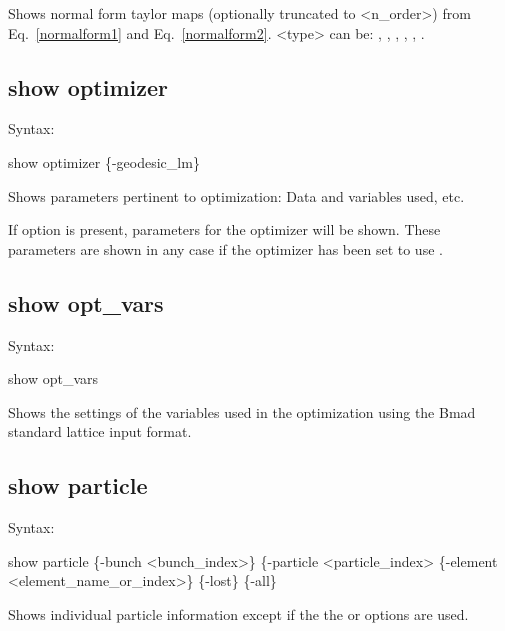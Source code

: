 {{{{{{{{Shows normal form taylor maps (optionally truncated to <n\_order>) from Eq.~\ref{normalform1}
 and Eq.~\ref{normalform2}. <type> can be: , , , , , .


\subsection{show optimizer}
\label{s:show.optimizer}

Syntax:
\begin{example}
  show optimizer \{-geodesic_lm\}
\end{example}


Shows parameters pertinent to optimization: Data and variables used,
etc. 

If  option is present, parameters for the  optimizer will
be shown. These parameters are shown in any case if the optimizer has been set to use
.



\subsection{show opt_vars}
\label{s:show.opt.vars}

Syntax:
\begin{example}
  show opt_vars
\end{example}


Shows the settings of the variables used in the optimization using the Bmad standard
lattice input format.


\subsection{show particle}
\label{s:show.particle}

Syntax:
\begin{example}
    show particle \{-bunch <bunch_index>\} \{-particle <particle_index>
                  \{-element <element_name_or_index>\} \{-lost\} \{-all\}
\end{example}


Shows individual particle information except if the the  or  options are used. 

}}}}}}}}
